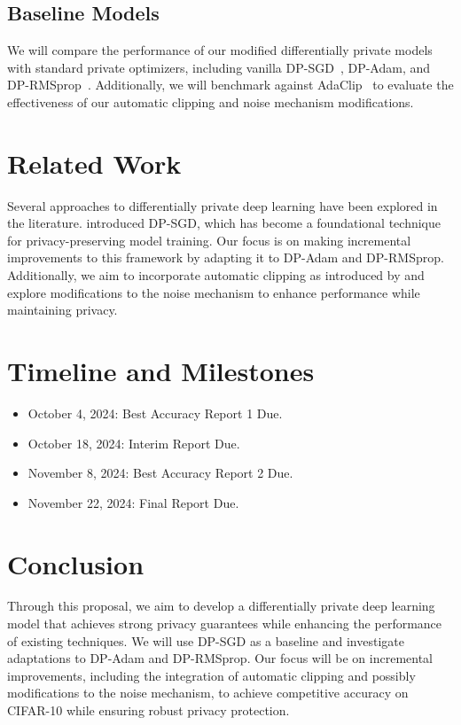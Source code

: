 \documentclass{article}
\begin{document}
    \subsection{Baseline Models}\label{subsec:baseline-models}
    We will compare the performance of our modified differentially private models with standard private optimizers,
    including vanilla DP-SGD~\citep{Abadi_2016_DeepLearningDifferentialPrivacy}, DP-Adam,
    and DP-RMSprop~\citep{zhou_2020_private_adaptive_algorithms}.
    Additionally, we will benchmark against AdaClip~\citep{adaClip_2019} to evaluate the effectiveness of our automatic
    clipping and noise mechanism modifications.


    \section{Related Work}\label{sec:related-work}
    Several approaches to differentially private deep learning have been explored in the literature.
    \citet{Abadi_2016_DeepLearningDifferentialPrivacy} introduced DP-SGD, which has become a foundational technique for
    privacy-preserving model training.
    Our focus is on making incremental improvements to this framework by adapting it to DP-Adam and DP-RMSprop.
    Additionally, we aim to incorporate automatic clipping as introduced by \citet{bu2023automaticclippingdifferentiallyprivate}
    and explore modifications to the noise mechanism to enhance performance while maintaining privacy.

\section{Timeline and Milestones}
\begin{itemize}
    \item October 4, 2024: Best Accuracy Report 1 Due.
    \item October 18, 2024: Interim Report Due.
    \item November 8, 2024: Best Accuracy Report 2 Due.
    \item November 22, 2024: Final Report Due.
\end{itemize}


    \section{Conclusion}\label{sec:conclusion}
    Through this proposal, we aim to develop a differentially private deep learning model that achieves strong
    privacy guarantees while enhancing the performance of existing techniques.
    We will use DP-SGD as a baseline and investigate adaptations to DP-Adam and DP-RMSprop.
    Our focus will be on incremental improvements, including the integration of automatic clipping and possibly
    modifications to the noise mechanism, to achieve competitive accuracy on CIFAR-10 while ensuring
    robust privacy protection.
\end{document}
